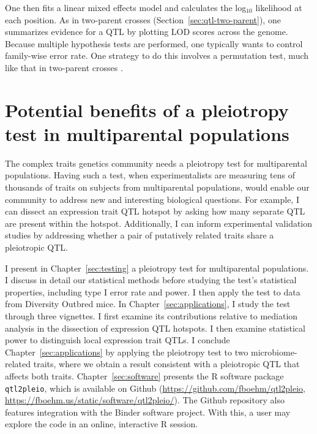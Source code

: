 \documentclass[oneside]{book}\usepackage[]{graphicx}\usepackage[]{color}
\begin{document}
One then fits a linear mixed effects model and calculates the log$_{10}$ likelihood at each position. As in two-parent crosses (Section~\ref{sec:qtl-two-parent}), one summarizes evidence for a QTL by plotting LOD scores across the genome. Because multiple hypothesis tests are performed, one typically wants to control family-wise error rate. One strategy to do this involves a permutation test, much like that in two-parent crosses \citep{churchill1994empirical}.


\section{Potential benefits of a pleiotropy test in multiparental populations}\label{sec:pleiotropy-mpp}

The complex traits genetics community needs a pleiotropy test for
multiparental populations. Having such a test, when experimentalists are
measuring tens of thousands of traits on subjects from multiparental populations,
would enable our community to address new and interesting biological questions.
For example, I can dissect an expression trait QTL hotspot by asking how many
separate QTL are present within the hotspot. Additionally, I can inform experimental
validation studies by addressing whether a pair of putatively related traits share a
pleiotropic QTL.

I present in Chapter~\ref{sec:testing} a pleiotropy test for multiparental populations. I discuss in 
detail our statistical methods before studying the test's statistical properties,
including type I error rate and power. I then apply the test to data from Diversity
Outbred mice. In Chapter~\ref{sec:applications}, I study the test through three vignettes. I first examine
its contributions relative to mediation analysis in the dissection of expression QTL
hotspots. I then examine statistical power to distinguish local expression trait QTLs.
I conclude Chapter~\ref{sec:applications} by applying the pleiotropy test to two microbiome-related traits,
where we obtain a result consistent with a pleiotropic QTL that affects both traits.
Chapter~\ref{sec:software} presents the R software package \texttt{qtl2pleio}, which is
available on Github (\url{https://github.com/fboehm/qtl2pleio}, 
\url{https://fboehm.us/static/software/qtl2pleio/}). The Github repository also
features integration with the Binder software project. With this, a user may explore the
code in an online, interactive R session. 
\end{document}
